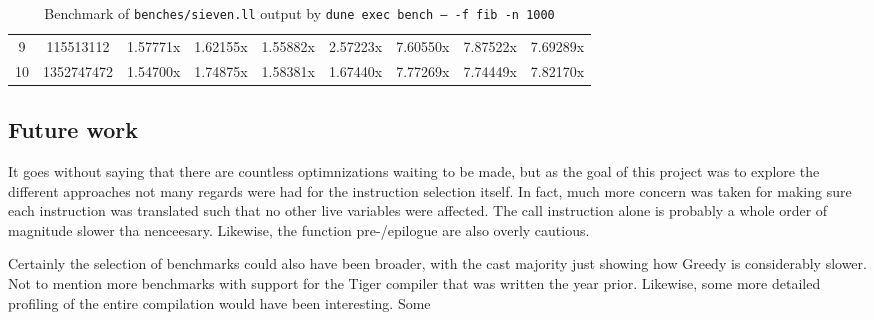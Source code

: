 \documentclass{article}
\begin{document}
\begin{table}[H]
{\begin{NiceTabular}{|c|cccccccc|}
9 &  115513112&  1.57771x&  1.62155x&  1.55882x&  2.57223x&  7.60550x&  7.87522x&  7.69289x\\
10 &  1352747472&  1.54700x&  1.74875x&  1.58381x&  1.67440x&  7.77269x&  7.74449x&  7.82170x\\
\hline
\end{NiceTabular}}
\caption{\label{tab:fannkuch}Benchmark of \texttt{benches/sieven.ll} output by \texttt{dune exec bench -- -f fib -n 1000}}
\end{table}







\subsection{Future work}

It goes without saying that there are countless optimnizations waiting to be made, but as the goal of this project was to explore the different approaches not many regards were had for the instruction selection itself. In fact, much more concern was taken for making sure each instruction was translated such that no other live variables were affected. The call instruction alone is probably a whole order of magnitude slower tha nenceesary. Likewise, the function pre-/epilogue are also overly cautious.

Certainly the selection of benchmarks could also have been broader, with the cast majority just showing how Greedy is considerably slower. Not to mention more benchmarks with support for the Tiger compiler that was written the year prior. Likewise, some more detailed profiling of the entire compilation would have been interesting. Some 
\end{document}
